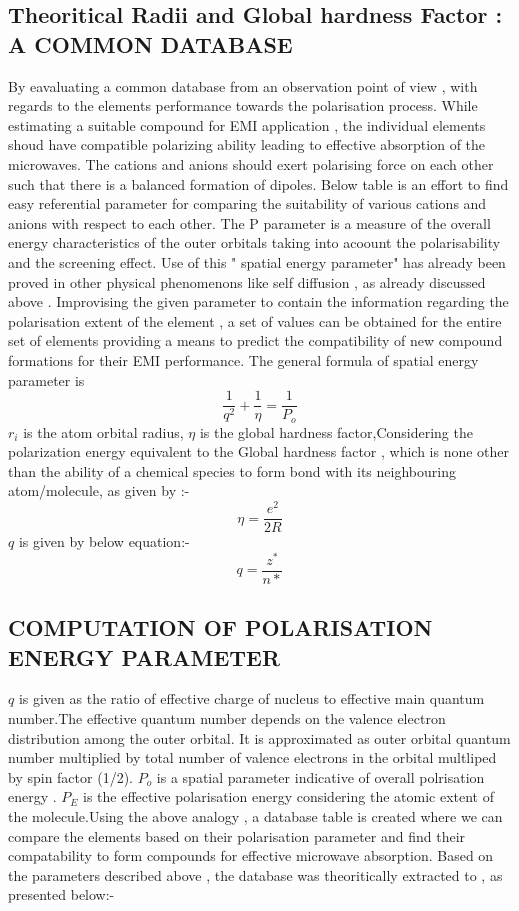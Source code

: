 \documentclass[journal]{IEEEtran}
\begin{document}
\subsection{Theoritical Radii and Global hardness Factor : A COMMON DATABASE}
By eavaluating a common database from an observation point of view , with regards to the elements performance towards the polarisation process. While estimating a suitable compound for EMI application , the individual elements shoud have compatible polarizing ability leading to effective absorption of the microwaves. The cations and anions should exert polarising force on each other such that there is a balanced formation of dipoles. Below table is an effort to find easy referential parameter for comparing the suitability of various cations and anions with respect to each other. The P parameter is a measure of the overall energy characteristics of the outer orbitals taking into acoount the polarisability and the screening effect. Use of this " spatial energy parameter" has already been proved in other physical phenomenons like self diffusion , as already discussed above . Improvising the given parameter to contain the information regarding the polarisation extent of the element , a set of values can be obtained for the entire set of elements providing a means to predict the compatibility of new compound formations for their EMI performance. The general formula of spatial energy parameter is 
\begin{equation}
\dfrac{1}{{q^2}} + \dfrac{1}{\eta} = \dfrac{1}{P_o}
\end{equation}
$r_i$ is the atom orbital radius, $\eta$ is the global hardness factor,Considering the polarization energy equivalent to the Global hardness factor , which is none other than the ability of a chemical species to form bond with its neighbouring atom/molecule, as given by :-
\begin{equation}
\eta = \dfrac{e^2}{2 R}
\end{equation}
$q$ is given by below equation:-
\begin{equation}
		q = \dfrac{z^*}{n*}   
\end{equation}
\subsection{COMPUTATION OF POLARISATION ENERGY PARAMETER}

$q$ is given as the ratio of effective charge of nucleus to effective main quantum number.The effective quantum number depends on the valence electron distribution among the outer orbital. It is approximated as outer orbital quantum number multiplied by total number of valence electrons in the orbital multliped by spin factor (1/2). $P_o$ is a spatial parameter indicative of overall polrisation energy . $P_E $ is the effective polarisation energy considering the atomic extent of the molecule.Using the above analogy , a database table is created where we can compare the elements based on their polarisation parameter and find their compatability to form compounds for effective microwave absorption.
Based on the parameters described above , the database was theoritically extracted to , as presented below:-
\end{document}
